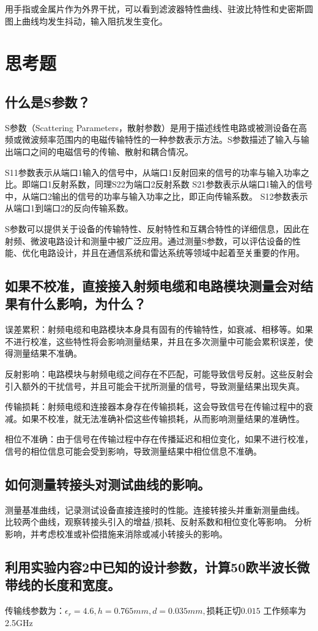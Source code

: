 \documentclass[12pt,hyperref,a4paper,UTF8]{ctexart}
\begin{document}
用手指或金属片作为外界干扰，可以看到滤波器特性曲线、驻波比特性和史密斯圆图上曲线均发生抖动，输入阻抗发生变化。


\section{思考题}
\subsection*{什么是S参数？}
S参数（Scattering Parameters，散射参数）是用于描述线性电路或被测设备在高频或微波频率范围内的电磁传输特性的一种参数表示方法。S参数描述了输入与输出端口之间的电磁信号的传输、散射和耦合情况。

S11参数表示从端口1输入的信号中，从端口1反射回来的信号的功率与输入功率之比。即端口1反射系数，同理S22为端口2反射系数
S21参数表示从端口1输入的信号中，从端口2输出的信号的功率与输入功率之比，即正向传输系数。
S12参数表示从端口1到端口2的反向传输系数。

S参数可以提供关于设备的传输特性、反射特性和互耦合特性的详细信息，因此在射频、微波电路设计和测量中被广泛应用。通过测量S参数，可以评估设备的性能、优化电路设计，并且在通信系统和雷达系统等领域中起着至关重要的作用。
\subsection*{如果不校准，直接接入射频电缆和电路模块测量会对结果有什么影响，为什么？}
误差累积：射频电缆和电路模块本身具有固有的传输特性，如衰减、相移等。如果不进行校准，这些特性将会影响测量结果，并且在多次测量中可能会累积误差，使得测量结果不准确。

反射影响：电路模块与射频电缆之间存在不匹配，可能导致信号反射。这些反射会引入额外的干扰信号，并且可能会干扰所测量的信号，导致测量结果出现失真。

传输损耗：射频电缆和连接器本身存在传输损耗，这会导致信号在传输过程中的衰减。如果不校准，就无法准确补偿这些传输损耗，从而影响测量结果的准确性。

相位不准确：由于信号在传输过程中存在传播延迟和相位变化，如果不进行校准，信号的相位信息可能会受到影响，导致测量结果中相位信息不准确。
\subsection*{如何测量转接头对测试曲线的影响。}
测量基准曲线，记录测试设备直接连接时的性能。连接转接头并重新测量曲线。
比较两个曲线，观察转接头引入的增益/损耗、反射系数和相位变化等影响。
分析影响，并考虑校准或补偿措施来消除或减小转接头的影响。
\subsection*{利用实验内容2中已知的设计参数，计算50欧半波长微带线的长度和宽度。}
传输线参数为：$\epsilon_{r}=4.6,h=0.765mm,d=0.035mm,\text{损耗正切}0.015$ 工作频率为2.5GHz
\end{document}
